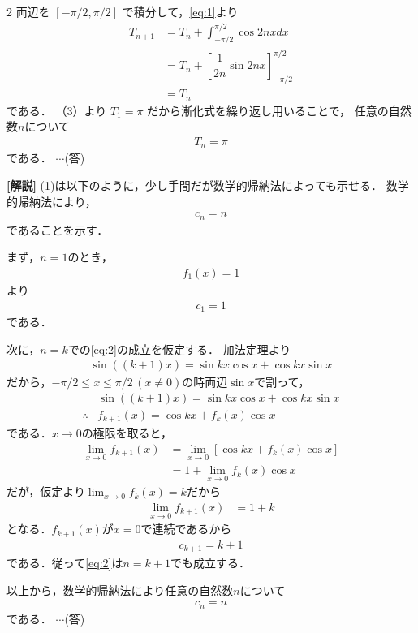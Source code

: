 \documentclass[../../main.tex]{subfiles}
\begin{document}
\begin{multicols}{2}
  両辺を $[- \pi/2, \pi/2]$ で積分して，\cref{eq:1}より
  \begin{align}
    T_{n+1}
    & = T_n + \int_{-\pi/2}^{\pi/2} \cos 2nx dx                  \\
    & = T_n + \left[\dfrac{1}{2n}\sin 2nx\right]_{-\pi/2}^{\pi/2} \\
    & = T_n
  \end{align}
  である．
  （3）より $T_1 = \pi$ だから漸化式を繰り返し用いることで，
  任意の自然数$n$について
  \begin{align}
    T_n=\pi
  \end{align}
  である． $\cdots$(答)

  {\bf [解説]}
  (1)は以下のように，少し手間だが数学的帰納法によっても示せる．
  数学的帰納法により，
  \begin{align}
    c_{n} = n \label{eq:2}
  \end{align}
  であることを示す．

  まず，$n=1$のとき，
  \begin{align}
    f_{1}(x) = 1
  \end{align}
  より
  \begin{align}
    c_{1} = 1
  \end{align}
  である．

  次に，$n=k$での\cref{eq:2}の成立を仮定する．
  加法定理より
  \begin{align}
    \sin((k+1)x) = \sin kx \cos x + \cos kx \sin x
  \end{align}
  だから，$-\pi/2 \le x \le \pi/2\, (x\neq 0)$の時両辺$\sin x$で割って，
  \begin{align}
    & \sin((k+1)x) = \sin kx \cos x + \cos kx \sin x \\
    \therefore
    & f_{k+1}(x) = \cos kx + f_{k}(x) \cos x
  \end{align}
  である．$x\to 0$の極限を取ると，
  \begin{align}
    \lim_{x\to 0} f_{k+1}(x)
    & = \lim_{x\to 0} \left[\cos kx + f_{k}(x) \cos x\right] \\
    & = 1  + \lim_{x\to 0} f_{k}(x) \cos x
  \end{align}
  だが，仮定より$\lim_{x\to 0} f_{k}(x)=k$だから
  \begin{align}
    \lim_{x\to 0} f_{k+1}(x)
    & = 1 + k
  \end{align}
  となる．$f_{k+1}(x)$が$x=0$で連続であるから
  \begin{align}
    c_{k+1} = k+1
  \end{align}
  である．従って\cref{eq:2}は$n=k+1$でも成立する．

  以上から，数学的帰納法により任意の自然数$n$について
  \begin{align}
    c_{n} = n
  \end{align}
  である． $\cdots$(答)

  \newpage
\end{multicols}
\end{document}
